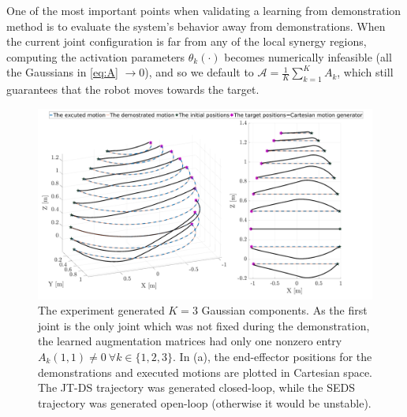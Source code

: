 \documentclass[letterpaper, 10 pt, journal, twoside, fleqn]{IEEEtran}
\begin{document}
One of the most important points when validating a learning from demonstration method is to evaluate the system's behavior away from demonstrations.
 When the current joint configuration is far from any of the local synergy regions, computing the activation parameters $\theta_k(\cdot)$ becomes numerically infeasible (all the Gaussians in \eqref{eq:A} $\rightarrow 0$), and so we default to $\mathcal{A} = \frac{1}{K}\sum\limits_{k=1}^{K}A_k$, which still guarantees that the robot moves towards the target. %

\begin{figure}[t]
		\includegraphics[width=\linewidth]{./figures/cropped_Sing_1.pdf}
	\caption{The experiment generated $K=3$ Gaussian components. As the first joint is the only joint which was not fixed during the demonstration, the learned augmentation matrices had only one nonzero entry $A_k(1,1)\neq0~\forall k\in \{1, 2, 3\} $.  In (a), the end-effector positions for the demonstrations and executed motions are plotted in Cartesian space. The JT-DS trajectory was generated closed-loop, while the SEDS trajectory was generated open-loop (otherwise it would be unstable).}
			\label{fig:Sin}
	\vspace{-20pt}
\end{figure}
\end{document}
